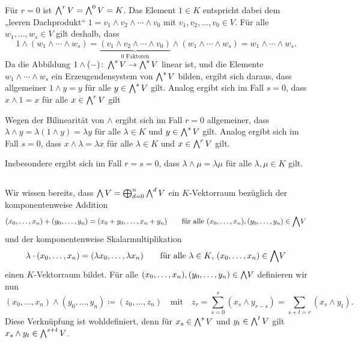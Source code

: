 \begin{remark}
  \label{remark: wedge product with scalars}
  Für $r = 0$ ist $\bigwedge^{r} V = \bigwedge^{0} V = K$.
  Das Element $1 \in K$ entspricht dabei dem „leeren Dachprodukt“ $1 = v_1 \wedge v_2 \wedge \dotsb \wedge v_0$ mit $v_1, v_2, \dotsc, v_0 \in V$.
  Für alle $w_1, \dotsc, w_s \in V$ gilt deshalb, dass
  \[
      1 \wedge (w_1 \wedge \dotsb \wedge w_s)
    = \underbrace{(v_1 \wedge v_2 \wedge \dotsb \wedge v_0)}_{\text{$0$ Faktoren}} \wedge (w_1 \wedge \dotsb \wedge w_s)
    = w_1 \wedge \dotsb \wedge w_s.
  \]
  Da die Abbildung $1 \wedge (-) \colon \bigwedge^{s} V \to \bigwedge^{s} V$ linear ist, und die Elemente $w_1 \wedge \dotsb \wedge w_s$  ein Erzeugendensystem von $\bigwedge^{s} V$ bilden, ergibt sich daraus, dass allgemeiner $1 \wedge y = y$ für alle $y \in \bigwedge^{s} V$ gilt.
  Analog ergibt sich im Fall $s = 0$, dass $x \wedge 1 = x$ für alle $x \in \bigwedge^{r} V$ gilt
  
  Wegen der Bilinearität von $\wedge$ ergibt sich im Fall $r = 0$ allgemeiner, dass $\lambda \wedge y = \lambda(1 \wedge y) = \lambda y$ für alle $\lambda \in K$ und $y \in \bigwedge^{s} V$ gilt.
  Analog ergibt sich im Fall $s = 0$, dass $x \wedge \lambda = \lambda x$ für alle $\lambda \in K$ und $x \in \bigwedge^{r} V$ gilt.
  
  Insbesondere ergibt sich im Fall $r = s = 0$, dass $\lambda \wedge \mu = \lambda \mu$ für alle $\lambda, \mu \in K$ gilt.
\end{remark}

\begin{remark*}
\end{remark*}






\subsection{}

Wir wissen bereits, dass $\bigwedge V = \bigoplus_{d=0}^n \bigwedge^{d} V$ ein $K$-Vektorraum bezüglich der komponentenweise Addition
\[
    (x_0, \dotsc, x_n) + (y_0, \dotsc, y_n) 
  = (x_0 + y_0, \dotsc, x_n + y_n)
  \qquad
  \text{für alle $(x_0, \dotsc, x_n), (y_0, \dotsc, y_n) \in \bigwedge\!V$}
\]
und der komponentenweise Skalarmultiplikation
\[
    \lambda \cdot (x_0, \dotsc, x_n)
  = (\lambda x_0, \dotsc, \lambda x_n)
  \qquad
  \text{für alle $\lambda \in K$, $(x_0, \dotsc, x_n) \in \bigwedge\!V$}
\]
einen $K$-Vektorraum bildet.
Für alle $(x_0, \dotsc, x_n), (y_0, \dotsc, y_n) \in \bigwedge\!V$ definieren wir nun
\[
            (x_0, \dotsc, x_n) \wedge (y_0, \dotsc, y_n)
  \coloneqq (z_0, \dotsc, z_n)
  \quad\text{mit}\quad
            z_r = \sum_{s=0}^r (x_s \wedge y_{r-s})
                = \sum_{s + t = r} (x_s \wedge y_t).
\]
Diese Verknüpfung ist wohldefiniert, denn für $x_s \in \bigwedge^{s} V$ und $y_t \in \bigwedge^{t} V$ gilt $x_s \wedge y_t \in \bigwedge^{s+t} V$.

